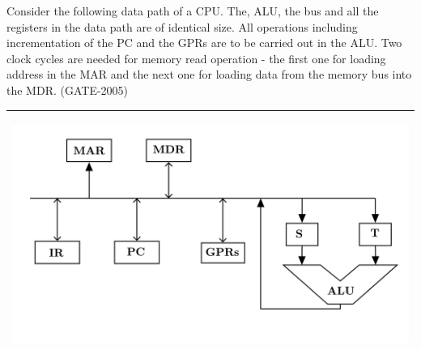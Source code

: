 \begin{questyle}
  \question  Consider the following data path of a CPU. The, ALU, the bus and all the registers
             in the data path are of identical size. All operations including incrementation of the
             PC and the GPRs are to be carried out in the ALU. Two clock cycles are needed for
             memory read operation - the first one for loading address in the MAR and the next
             one for loading data from the memory bus into the MDR. (GATE-2005)

             \begin{myTableStyle} \begin{tabular}{ |m{14cm}| } \hline
                  \begin{center} \includegraphics[scale=0.15]{./images/data_path_02.jpeg} \end{center}\\ \hline
            \end{tabular} \end{myTableStyle} \vspace{0.08in}

\end{questyle}
